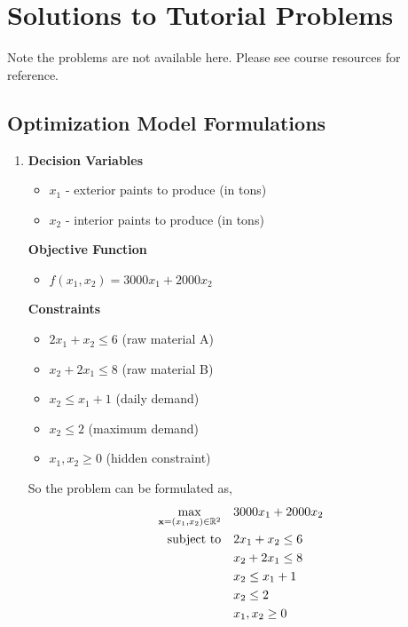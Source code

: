 \chapter{Solutions to Tutorial Problems}

Note the problems are not available here. Please see course resources for reference.

\section{Optimization Model Formulations}

\begin{enumerate}
    \item
          \begin{minipage}[t]{0.45\textwidth}
              \textbf{Decision Variables}
              \begin{itemize}
                  \item \(x_1\) - exterior paints to produce (in tons)
                  \item \(x_2\) - interior paints to produce (in tons)
              \end{itemize}
              \textbf{Objective Function}
              \begin{itemize}
                  \item \(f(x_1, x_2) = 3000x_1 + 2000x_2\)
              \end{itemize}
          \end{minipage}
          \hfill
          \begin{minipage}[t]{0.45\textwidth}
              \textbf{Constraints}
              \begin{itemize}
                  \item \(2x_1 + x_2 \leq 6\) (raw material A)
                  \item \(x_2 + 2x_1 \leq 8\) (raw material B)
                  \item \(x_2 \leq x_1 + 1\) (daily demand)
                  \item \(x_2 \leq 2\) (maximum demand)
                  \item \(x_1, x_2 \geq 0\) (hidden constraint)
              \end{itemize}
          \end{minipage}

          So the problem can be formulated as,
          \begin{align*}
              \max_{\mathbf{x} = (x_1, x_2) \in \mathbb{R}^2} \quad & 3000x_1 + 2000x_2 \\
              \text{subject to}\quad                  & 2x_1 + x_2 \leq 6 \\
                                                      & x_2 + 2x_1 \leq 8 \\
                                                      & x_2 \leq x_1 + 1  \\
                                                      & x_2 \leq 2        \\
                                                      & x_1, x_2 \geq 0
          \end{align*}


\end{enumerate}
